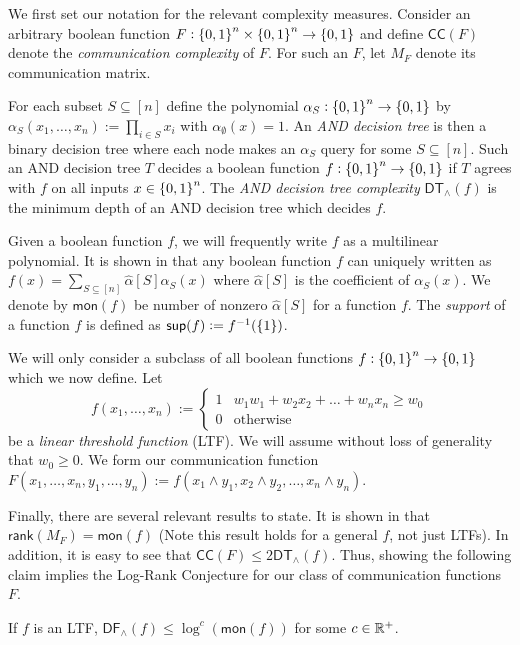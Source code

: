 We first set our notation for the relevant complexity measures. Consider an arbitrary boolean function $F : \set{0,1}^n\times\set{0,1}^n\to\set{0,1}$ and define $\mathsf{CC}(F)$ denote the \textit{communication complexity} of $F$. For such an $F$, let $M_F$ denote its communication matrix. 
    
    For each subset $S\subseteq [n]$ define the polynomial $\alpha_S : \set{0,1}^n\to \set{0,1}$ by $\alpha_S(x_1,\dots,x_n) := \prod_{i\in S} x_i$ with $\alpha_\emptyset(x) = 1$. An \textit{AND decision tree} is then a binary decision tree where each node makes an $\alpha_S$ query for some $S\subseteq [n]$. Such an AND decision tree $T$ decides a boolean function $f : \set{0,1}^n\to\set{0,1}$ if $T$ agrees with $f$ on all inputs $x\in \set{0,1}^n$. The \textit{AND decision tree complexity} $\mathsf{DT}_{\wedge}(f)$ is the minimum depth of an AND decision tree which decides $f$. 
    
    Given a boolean function $f$, we will frequently write $f$ as a multilinear polynomial. It is shown in \cite{ODonnell2007} that any boolean function $f$ can uniquely written as $f(x) = \sum_{S\subseteq [n]} \hat{\alpha}[S]\alpha_S(x)$ where $\hat{\alpha}[S]$ is the coefficient of $\alpha_S(x)$. We denote by $\mathsf{mon}(f)$ be number of nonzero $\hat{\alpha}[S]$ for a function $f$. The \textit{support} of a function $f$ is defined as $\mathsf{sup}(f) := f^{-1}(\set{1})$.
    
	We will only consider a subclass of all boolean functions $f: \set{0,1}^n\to \set{0,1}$ which we now define. Let 
    \[
    f(x_1,\dots,x_n) := \begin{cases}
		1 & w_1w_1 + w_2x_2 + \dots + w_nx_n \geq w_0\\
        0 & \text{otherwise}
	\end{cases}
    \] be a \textit{linear threshold function} (LTF). We will assume without loss of generality that $w_0 \geq 0$. We form our communication function $F(x_1,\dots,x_n,y_1,\dots,y_n) := f(x_1\wedge y_1,x_2\wedge y_2,\dots,x_n\wedge y_n)$. 
    
    Finally, there are several relevant results to state. It is shown in \cite{Buhrman1999} that $\mathsf{rank}(M_F) = \mathsf{mon}(f)$ (Note this result holds for a general $f$, not just LTFs). In addition, it is easy to see that $\mathsf{CC}(F) \leq 2\mathsf{DT}_{\wedge}(f)$. Thus, showing the following claim implies the Log-Rank Conjecture for our class of communication functions $F$.
    \begin{proposition}\label{logRankDTC}
    	If $f$ is an LTF, $\mathsf{DF}_{\wedge}(f) \leq \log^c(\mathsf{mon}(f))$ for some $c \in \mathbb{R}^+$.
    \end{proposition}